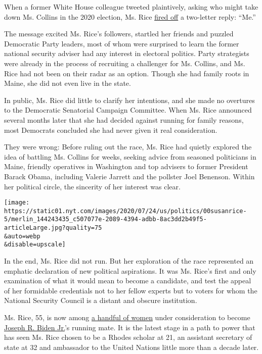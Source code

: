 When a former White House colleague tweeted plaintively, asking who
might take down Ms. Collins in the 2020 election, Ms. Rice
\href{https://twitter.com/ambassadorrice/status/1048305496732491777}{fired
off} a two-letter reply: ``Me.''

The message excited Ms. Rice's followers, startled her friends and
puzzled Democratic Party leaders, most of whom were surprised to learn
the former national security adviser had any interest in electoral
politics. Party strategists were already in the process of recruiting a
challenger for Ms. Collins, and Ms. Rice had not been on their radar as
an option. Though she had family roots in Maine, she did not even live
in the state.

In public, Ms. Rice did little to clarify her intentions, and she made
no overtures to the Democratic Senatorial Campaign Committee. When Ms.
Rice announced several months later that she had decided against running
for family reasons, most Democrats concluded she had never given it real
consideration.

They were wrong: Before ruling out the race, Ms. Rice had quietly
explored the idea of battling Ms. Collins for weeks, seeking advice from
seasoned politicians in Maine, friendly operatives in Washington and top
advisers to former President Barack Obama, including Valerie Jarrett and
the pollster Joel Benenson. Within her political circle, the sincerity
of her interest was clear.

\texttt{[image: https://static01.nyt.com/images/2020/07/24/us/politics/00susanrice-5/merlin\_144243435\_c507077e-2089-4394-adbb-8ac3dd2b49f5-articleLarge.jpg?quality=75\\\&auto=webp\\\&disable=upscale]}

In the end, Ms. Rice did not run. But her exploration of the race
represented an emphatic declaration of new political aspirations. It was
Ms. Rice's first and only examination of what it would mean to become a
candidate, and test the appeal of her formidable credentials not to her
fellow experts but to voters for whom the National Security Council is a
distant and obscure institution.

Ms. Rice, 55, is now among
\href{https://www.nytimes.com/article/biden-vice-president-2020.html}{a
handful of women} under consideration to become
\href{https://www.nytimes.com/interactive/2020/us/elections/joe-biden.html}{Joseph
R. Biden Jr.}'s running mate. It is the latest stage in a path to power
that has seen Ms. Rice chosen to be a Rhodes scholar at 21, an assistant
secretary of state at 32 and ambassador to the United Nations little
more than a decade later.

